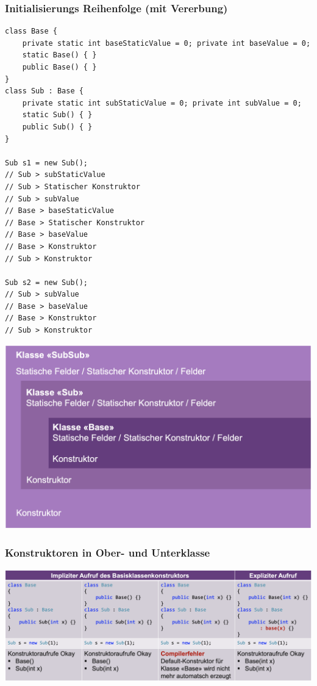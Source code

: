 \subsubsection{Initialisierungs Reihenfolge (mit Vererbung)}
\begin{lstlisting}
class Base {
    private static int baseStaticValue = 0; private int baseValue = 0;
    static Base() { }
    public Base() { }
}
class Sub : Base {
    private static int subStaticValue = 0; private int subValue = 0;
    static Sub() { }
    public Sub() { }
}

Sub s1 = new Sub();
// Sub > subStaticValue
// Sub > Statischer Konstruktor
// Sub > subValue
// Base > baseStaticValue
// Base > Statischer Konstruktor
// Base > baseValue
// Base > Konstruktor
// Sub > Konstruktor

Sub s2 = new Sub();
// Sub > subValue
// Base > baseValue
// Base > Konstruktor
// Sub > Konstruktor
\end{lstlisting}
\vspace{-8pt}
\begin{center}
    \includegraphics[scale=.2]{graphic/klassen/K&S_Init.png}
\end{center}
\vspace{-8pt}
\subsubsection{Konstruktoren in Ober- und Unterklasse}
\begin{center}
    \includegraphics[scale=.19]{graphic/klassen/K&S_Konstruktoren in Ober- und Unterklasse.png}
\end{center}
\vspace{-8pt}


